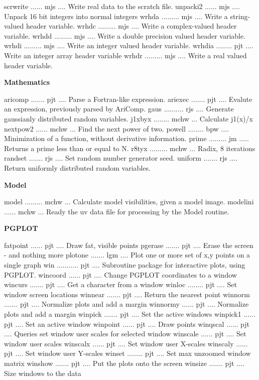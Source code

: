 {\eightpoint\begintt
scrwrite ...... mjs .... Write real data to the scratch file.
unpacki2 ...... mjs .... Unpack 16 bit integers into normal integers
wrhda ......... mjs .... Write a string-valued header variable.
wrhdc ......... mjs .... Write a complex-valued header variable.
wrhdd ......... mjs .... Write a double precision valued header variable.
\endtt}
{\eightpoint\begintt
wrhdi ......... mjs .... Write an integer valued header variable.
wrhdia ........ pjt .... Write an integer array header variable
wrhdr ......... mjs .... Write a real valued header variable.
\endtt}
\par\centerline{\bf Mathematics}
{\eightpoint\begintt
aricomp ....... pjt .... Parse a Fortran-like expression.
ariexec ....... pjt .... Evalute an expression, previously parsed by AriComp.
gaus .......... rjs .... Generate gaussianly distributed random variables.
j1xbyx ........ mchw ... Calculate j1(x)/x
nextpow2 ...... mchw ... Find the next power of two.
powell ........ bpw .... Minimization of a function, without derivative information.
prime ......... jm ..... Returns a prime less than or equal to N.
r8tyx ......... mchw ... Radix, 8 iterations
randset ....... rjs .... Set random number generator seed.
uniform ....... rjs .... Return uniformly distributed random variables.
\endtt}
\par\centerline{\bf Model}
{\eightpoint\begintt
model ......... mchw ... Calculate model visibilities, given a model image.
modelini ...... mchw ... Ready the uv data file for processing by the Model routine.
\endtt}
\par\centerline{\bf PGPLOT}
{\eightpoint\begintt
fatpoint ...... pjt .... Draw fat, visible points
pgerase ....... pjt .... Erase the screen - and nothing more
plotone ....... lgm .... Plot one or more set of x,y points on a single graph
win ........... pjt .... Subroutine package for interactive plots, using PGPLOT.
wincoord ...... pjt .... Change PGPLOT coordinates to a window
\endtt}
{\eightpoint\begintt
wincurs ....... pjt .... Get a character from a window
winloc ........ pjt .... Set window screen locations
winnear ....... pjt .... Return the nearest point
winnorm ....... pjt .... Normalize plots and add a margin
winnormy ...... pjt .... Normalize plots and add a margin
\endtt}
{\eightpoint\begintt
winpick ....... pjt .... Set the active windows
winpick1 ...... pjt .... Set an active window
winpoint ...... pjt .... Draw points
winqscal ...... pjt .... Queries set window user scales for selected window
winscale ...... pjt .... Set window user scales
\endtt}
{\eightpoint\begintt
winscalx ...... pjt .... Set window user X-scales
winscaly ...... pjt .... Set window user Y-scales
winset ........ pjt .... Set max unzoomed window matrix
winshow ....... pjt .... Put the plots onto the screen
winsize ....... pjt .... Size windows to the data
\endtt}
